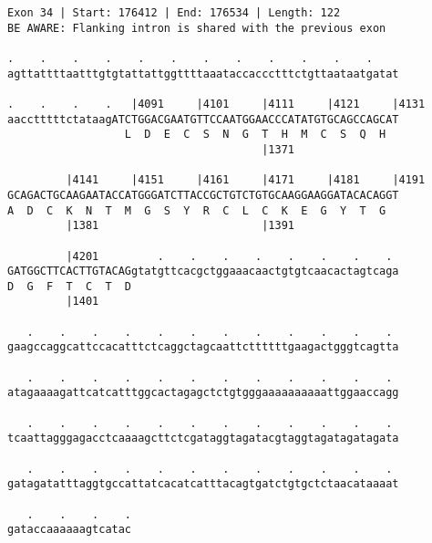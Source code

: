 \documentclass{article}
\begin{document}
\begin{Verbatim}[fontfamily=courier]
Exon 34 | Start: 176412 | End: 176534 | Length: 122
BE AWARE: Flanking intron is shared with the previous exon

.    .    .    .    .    .    .    .    .    .    .    .    
agttattttaatttgtgtattattggttttaaataccaccctttctgttaataatgatat

.    .    .    .   |4091     |4101     |4111     |4121     |4131
aacctttttctataagATCTGGACGAATGTTCCAATGGAACCCATATGTGCAGCCAGCAT
                  L  D  E  C  S  N  G  T  H  M  C  S  Q  H  
                                       |1371                

         |4141     |4151     |4161     |4171     |4181     |4191
GCAGACTGCAAGAATACCATGGGATCTTACCGCTGTCTGTGCAAGGAAGGATACACAGGT
A  D  C  K  N  T  M  G  S  Y  R  C  L  C  K  E  G  Y  T  G  
         |1381                         |1391                

         |4201         .    .    .    .    .    .    .    . 
GATGGCTTCACTTGTACAGgtatgttcacgctggaaacaactgtgtcaacactagtcaga
D  G  F  T  C  T  D                                         
         |1401                                              

   .    .    .    .    .    .    .    .    .    .    .    . 
gaagccaggcattccacatttctcaggctagcaattcttttttgaagactgggtcagtta

   .    .    .    .    .    .    .    .    .    .    .    . 
atagaaaagattcatcatttggcactagagctctgtgggaaaaaaaaaattggaaccagg

   .    .    .    .    .    .    .    .    .    .    .    . 
tcaattagggagacctcaaaagcttctcgataggtagatacgtaggtagatagatagata

   .    .    .    .    .    .    .    .    .    .    .    . 
gatagatatttaggtgccattatcacatcatttacagtgatctgtgctctaacataaaat

   .    .    .    .
gataccaaaaaagtcatac
\end{Verbatim}
\newpage
\end{document}

